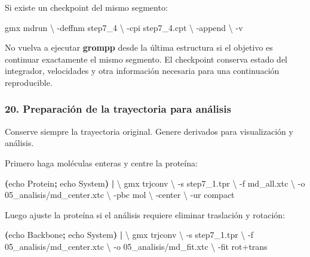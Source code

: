 \documentclass[
  spanish,
  11pt,
  a4paper]{article}
\newenvironment{Shaded}{\begin{snugshade}}{\end{snugshade}}
\newcommand{\AttributeTok}[1]{\textcolor[rgb]{0.13,0.29,0.53}{#1}}
\newcommand{\BuiltInTok}[1]{#1}
\newcommand{\DataTypeTok}[1]{\textcolor[rgb]{0.13,0.29,0.53}{#1}}
\newcommand{\ExtensionTok}[1]{#1}
\newcommand{\KeywordTok}[1]{\textcolor[rgb]{0.13,0.29,0.53}{\textbf{#1}}}
\newcommand{\NormalTok}[1]{#1}
\begin{document}
Si existe un checkpoint del mismo segmento:

\begin{Shaded}
\begin{Highlighting}[]
\ExtensionTok{gmx}\NormalTok{ mdrun }\DataTypeTok{\textbackslash{}}
    \AttributeTok{{-}deffnm}\NormalTok{ step7\_4 }\DataTypeTok{\textbackslash{}}
    \AttributeTok{{-}cpi}\NormalTok{ step7\_4.cpt }\DataTypeTok{\textbackslash{}}
    \AttributeTok{{-}append} \DataTypeTok{\textbackslash{}}
    \AttributeTok{{-}v}
\end{Highlighting}
\end{Shaded}

No vuelva a ejecutar \textbf{grompp} desde la última estructura si el
objetivo es continuar exactamente el mismo segmento. El checkpoint
conserva estado del integrador, velocidades y otra información necesaria
para una continuación reproducible.

\subsubsection{20. Preparación de la trayectoria para
análisis}\label{preparaciuxf3n-de-la-trayectoria-para-anuxe1lisis}

Conserve siempre la trayectoria original. Genere derivados para
visualización y análisis.

Primero haga moléculas enteras y centre la proteína:

\begin{Shaded}
\begin{Highlighting}[]
\KeywordTok{(}\BuiltInTok{echo}\NormalTok{ Protein}\KeywordTok{;} \BuiltInTok{echo}\NormalTok{ System}\KeywordTok{)} \KeywordTok{|} \DataTypeTok{\textbackslash{}}
\ExtensionTok{gmx}\NormalTok{ trjconv }\DataTypeTok{\textbackslash{}}
    \AttributeTok{{-}s}\NormalTok{ step7\_1.tpr }\DataTypeTok{\textbackslash{}}
    \AttributeTok{{-}f}\NormalTok{ md\_all.xtc }\DataTypeTok{\textbackslash{}}
    \AttributeTok{{-}o}\NormalTok{ 05\_analisis/md\_center.xtc }\DataTypeTok{\textbackslash{}}
    \AttributeTok{{-}pbc}\NormalTok{ mol }\DataTypeTok{\textbackslash{}}
    \AttributeTok{{-}center} \DataTypeTok{\textbackslash{}}
    \AttributeTok{{-}ur}\NormalTok{ compact}
\end{Highlighting}
\end{Shaded}

Luego ajuste la proteína si el análisis requiere eliminar traslación y
rotación:

\begin{Shaded}
\begin{Highlighting}[]
\KeywordTok{(}\BuiltInTok{echo}\NormalTok{ Backbone}\KeywordTok{;} \BuiltInTok{echo}\NormalTok{ System}\KeywordTok{)} \KeywordTok{|} \DataTypeTok{\textbackslash{}}
\ExtensionTok{gmx}\NormalTok{ trjconv }\DataTypeTok{\textbackslash{}}
    \AttributeTok{{-}s}\NormalTok{ step7\_1.tpr }\DataTypeTok{\textbackslash{}}
    \AttributeTok{{-}f}\NormalTok{ 05\_analisis/md\_center.xtc }\DataTypeTok{\textbackslash{}}
    \AttributeTok{{-}o}\NormalTok{ 05\_analisis/md\_fit.xtc }\DataTypeTok{\textbackslash{}}
    \AttributeTok{{-}fit}\NormalTok{ rot+trans}
\end{Highlighting}
\end{Shaded}
\end{document}
